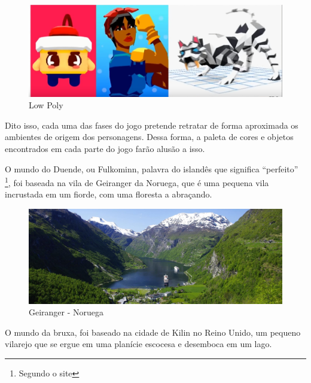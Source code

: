\begin{figure}[htb]
    \caption{\label{fig_lowpoly}Low Poly}
    \begin{center}
        \includegraphics[width=\textwidth]{imagens/lowPoly.jpg}
    \end{center}
\end{figure}

Dito isso, cada uma das fases do jogo pretende retratar de forma aproximada os ambientes de origem dos personagens. Dessa forma, a paleta de cores e objetos encontrados em cada parte do jogo farão alusão a isso.

O mundo do Duende, ou Fulkominn, palavra do islandês que significa ``perfeito'' \footnote{Segundo o site }, foi baseada na vila de Geiranger da Noruega, que é uma pequena vila incrustada em um fiorde, com uma floresta a abraçando.

\clearpage

\begin{figure}[htb]
    \caption{\label{fig_mundoDuende}Geiranger - Noruega}
    \begin{center}
        \includegraphics[width=\textwidth]{imagens/geiranger.jpeg}
    \end{center}
\end{figure}



O mundo da bruxa, foi baseado na cidade de Kilin no Reino Unido, um pequeno vilarejo que se ergue em uma planície escocesa e desemboca em um lago.

